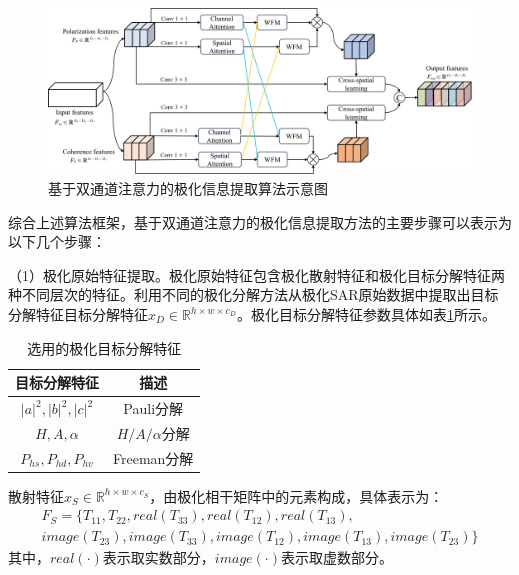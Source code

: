 \begin{figure}[h]
    \centering
    \includegraphics[width=14cm]{pic/chapter3/DPEN_framework.png}
    \caption{基于双通道注意力的极化信息提取算法示意图}
    \label{DPEN_framework}
\end{figure}


综合上述算法框架，基于双通道注意力的极化信息提取方法的主要步骤可以表示为以下几个步骤：

（1）极化原始特征提取。极化原始特征包含极化散射特征和极化目标分解特征两种不同层次的特征。利用不同的极化分解方法从极化SAR原始数据中提取出目标分解特征目标分解特征$x_D \in \mathbb{R}^{h\times w \times c_D}$。极化目标分解特征参数具体如表\ref{decomposision feature}所示。
\begin{table}[h]
    \caption{选用的极化目标分解特征}
    \begin{tabular}{cc}
        \hline \hline
        目标分解特征 & 描述             \\ \hline
        $\left| a \right|^2,\left| b \right|^2,\left| c \right|^2$
               & Pauli分解        \\ \hline
        $H,A,\alpha$
               & $H/A/\alpha$分解 \\ \hline
        $P_{hs},P_{hd},P_{hv}$
               & Freeman分解      \\ \hline \hline
    \end{tabular}
    \label{decomposision feature}
\end{table}

散射特征$x_S \in \mathbb{R}^{h\times w \times c_S}$，由极化相干矩阵中的元素构成，具体表示为：
\begin{equation}
    \begin{aligned}
        F_S=\{T_{11},T_{22},real(T_{33}),real(T_{12}),real(T_{13}),
        \\
        image(T_{23}),image(T_{33}),image(T_{12}),image(T_{13}),image(T_{23})\}
    \end{aligned}
\end{equation}
其中，$real(\cdot)$表示取实数部分，$image(\cdot)$表示取虚数部分。

